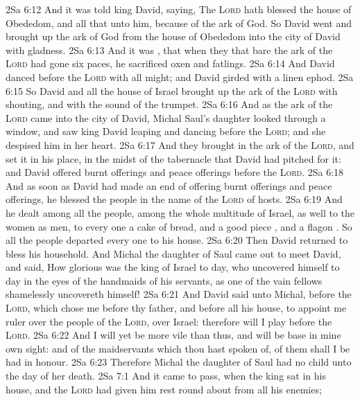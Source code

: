 \vs 2Sa 6:12 And it was told king David, saying, The \textsc{Lord} hath blessed the house of Obededom, and all that  unto him, because of the ark of God. So David went and brought up the ark of God from the house of Obededom into the city of David with gladness.
\vs 2Sa 6:13 And it was , that when they that bare the ark of the \textsc{Lord} had gone six paces, he sacrificed oxen and fatlings.
\vs 2Sa 6:14 And David danced before the \textsc{Lord} with all  might; and David  girded with a linen ephod.
\vs 2Sa 6:15 So David and all the house of Israel brought up the ark of the \textsc{Lord} with shouting, and with the sound of the trumpet.
\vs 2Sa 6:16 And as the ark of the \textsc{Lord} came into the city of David, Michal Saul's daughter looked through a window, and saw king David leaping and dancing before the \textsc{Lord}; and she despised him in her heart.
\vs 2Sa 6:17 And they brought in the ark of the \textsc{Lord}, and set it in his place, in the midst of the tabernacle that David had pitched for it: and David offered burnt offerings and peace offerings before the \textsc{Lord}.
\vs 2Sa 6:18 And as soon as David had made an end of offering burnt offerings and peace offerings, he blessed the people in the name of the \textsc{Lord} of hosts.
\vs 2Sa 6:19 And he dealt among all the people,  among the whole multitude of Israel, as well to the women as men, to every one a cake of bread, and a good piece , and a flagon . So all the people departed every one to his house.
\vs 2Sa 6:20 Then David returned to bless his household. And Michal the daughter of Saul came out to meet David, and said, How glorious was the king of Israel to day, who uncovered himself to day in the eyes of the handmaids of his servants, as one of the vain fellows shamelessly uncovereth himself!
\vs 2Sa 6:21 And David said unto Michal,  before the \textsc{Lord}, which chose me before thy father, and before all his house, to appoint me ruler over the people of the \textsc{Lord}, over Israel: therefore will I play before the \textsc{Lord}.
\vs 2Sa 6:22 And I will yet be more vile than thus, and will be base in mine own sight: and of the maidservants which thou hast spoken of, of them shall I be had in honour.
\vs 2Sa 6:23 Therefore Michal the daughter of Saul had no child unto the day of her death.
\vs 2Sa 7:1 And it came to pass, when the king sat in his house, and the \textsc{Lord} had given him rest round about from all his enemies;
